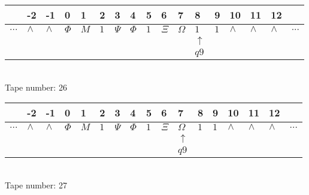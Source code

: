 \documentclass{article}
\begin{document}
\begin{table}[H]
\centering
\begin{tabular}{lllllllllllllllll}
 & -2 & -1 & 0 & 1 & 2 & 3 & 4 & 5 & 6 & 7 & 8 & 9 & 10 & 11 & 12 & \\
\hline
$...$ & \multicolumn{1}{|l|}{$\wedge$} & \multicolumn{1}{|l|}{$\wedge$} & \multicolumn{1}{|l|}{$\Phi$} & \multicolumn{1}{|l|}{$M$} & \multicolumn{1}{|l|}{$1$} & \multicolumn{1}{|l|}{$\Psi$} & \multicolumn{1}{|l|}{$\Phi$} & \multicolumn{1}{|l|}{$1$} & \multicolumn{1}{|l|}{$\Xi$} & \multicolumn{1}{|l|}{$\Omega$} & \multicolumn{1}{|l|}{$1$} & \multicolumn{1}{|l|}{$1$} & \multicolumn{1}{|l|}{$\wedge$} & \multicolumn{1}{|l|}{$\wedge$} & \multicolumn{1}{|l|}{$\wedge$} & $...$\\
\hline
&  &  &  &  &  &  &  &  &  &  & $\uparrow$ &  &  &  &  &  \\
&  &  &  &  &  &  &  &  &  &  & $ q9 $ &  &  &  &  &  \\
\end{tabular}
\\
Tape number: 26
\noindent\makebox[\linewidth]{\hdashrule{\textwidth}{1pt}{1pt}}\end{table}

\begin{table}[H]
\centering
\begin{tabular}{lllllllllllllllll}
 & -2 & -1 & 0 & 1 & 2 & 3 & 4 & 5 & 6 & 7 & 8 & 9 & 10 & 11 & 12 & \\
\hline
$...$ & \multicolumn{1}{|l|}{$\wedge$} & \multicolumn{1}{|l|}{$\wedge$} & \multicolumn{1}{|l|}{$\Phi$} & \multicolumn{1}{|l|}{$M$} & \multicolumn{1}{|l|}{$1$} & \multicolumn{1}{|l|}{$\Psi$} & \multicolumn{1}{|l|}{$\Phi$} & \multicolumn{1}{|l|}{$1$} & \multicolumn{1}{|l|}{$\Xi$} & \multicolumn{1}{|l|}{$\Omega$} & \multicolumn{1}{|l|}{$1$} & \multicolumn{1}{|l|}{$1$} & \multicolumn{1}{|l|}{$\wedge$} & \multicolumn{1}{|l|}{$\wedge$} & \multicolumn{1}{|l|}{$\wedge$} & $...$\\
\hline
&  &  &  &  &  &  &  &  &  & $\uparrow$ &  &  &  &  &  &  \\
&  &  &  &  &  &  &  &  &  & $ q9 $ &  &  &  &  &  &  \\
\end{tabular}
\\
Tape number: 27
\noindent\makebox[\linewidth]{\hdashrule{\textwidth}{1pt}{1pt}}\end{table}
\end{document}

